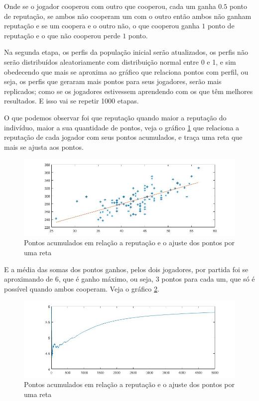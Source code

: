 Onde se o jogador cooperou com outro que cooperou, cada um ganha $0.5$ ponto de reputação, se ambos não cooperam um com o outro então ambos não ganham reputação e se um coopera e o outro não, o que cooperou ganha $1$ ponto de reputação e o que não cooperou perde $1$ ponto.

Na segunda etapa, os perfis da população inicial serão atualizados, os perfis não serão distribuídos aleatoriamente com distribuição normal entre 0 e 1, e sim obedecendo que mais se aproxima ao gráfico que relaciona pontos com perfil, ou seja, os perfis que geraram mais pontos para seus jogadores, serão mais replicados; como se os jogadores estivessem aprendendo com os que têm melhores resultados. E isso vai se repetir 1000 etapas.

O que podemos observar foi que reputação quando maior a reputação do indivíduo, maior a sua quantidade de pontos, veja o gráfico \ref{fig14} que relaciona a reputação de cada jogador com seus pontos acumulados, e traça uma reta que mais se ajusta aos pontos.

\begin{figure}[H]
\centering
\includegraphics[width=14cm]{imagens/graf14.jpg}
\caption{Pontos acumulados em relação a reputação e o ajuste dos pontos por uma reta}
\label{fig14}
\end{figure}

E a média das somas dos pontos ganhos, pelos dois jogadores, por partida foi se aproximando de $6$, que é ganho máximo, ou seja, $3$ pontos para cada um, que só é possível quando ambos cooperam. Veja o gráfico \ref{fig15}.

\begin{figure}[H]
\centering
\includegraphics[width=14cm]{imagens/graf15.jpg}
\caption{Pontos acumulados em relação a reputação e o ajuste dos pontos por uma reta}
\label{fig15}
\end{figure}

